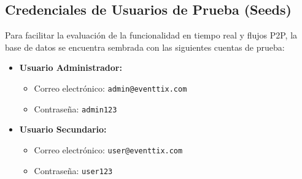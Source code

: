 \subsection{Credenciales de Usuarios de Prueba (Seeds)}
Para facilitar la evaluación de la funcionalidad en tiempo real y flujos P2P, la base de datos se encuentra sembrada con las siguientes cuentas de prueba:
\begin{itemize}
    \item \textbf{Usuario Administrador:}
    \begin{itemize}
        \item Correo electrónico: \texttt{admin@eventtix.com}
        \item Contraseña: \texttt{admin123}
    \end{itemize}
    \item \textbf{Usuario Secundario:}
    \begin{itemize}
        \item Correo electrónico: \texttt{user@eventtix.com}
        \item Contraseña: \texttt{user123}
    \end{itemize}
\end{itemize}


